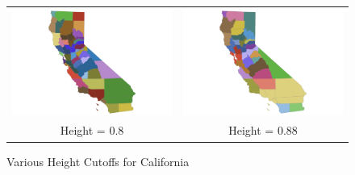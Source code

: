 \appendix
\setcounter{table}{0}
\renewcommand{\thetable}{A\arabic{table}}   
\setcounter{figure}{0}
\renewcommand{\thefigure}{A\arabic{figure}}   

\begin{figure}[th]
\caption{Various Height Cutoffs for California \label{fig:caliclusters}}
\begin{tabular}{cc}
\includegraphics[scale=0.1]{./figures/insetmaps/california_clustermap_800_inset6.png} & \includegraphics[scale=0.1]{./figures/insetmaps/california_clustermap_880_inset6.png} \\
Height = 0.8 & Height = 0.88 \\

\end{tabular}
\end{figure}
